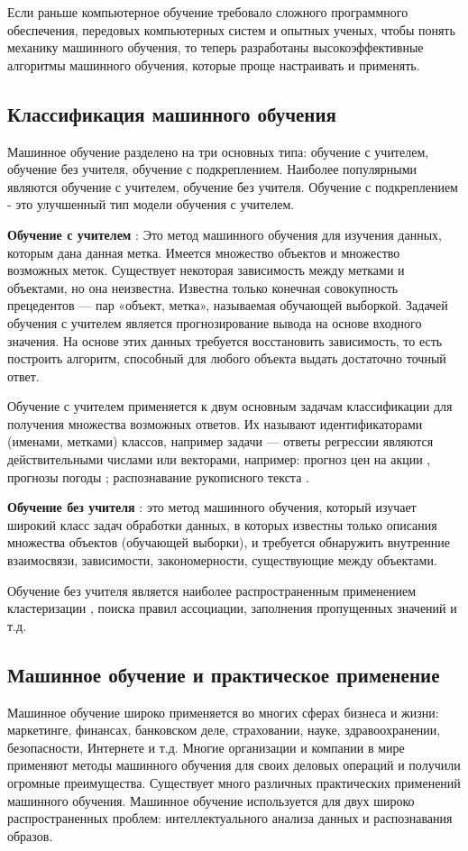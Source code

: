 \documentclass[a4paper,14pt]{extreport}
\begin{document}
Если раньше компьютерное обучение требовало сложного программного обеспечения, передовых компьютерных систем и опытных ученых, чтобы понять механику машинного обучения, то теперь разработаны высокоэффективные алгоритмы машинного обучения, которые проще настраивать и применять.
\subsection{Классификация машинного обучения}
Машинное обучение разделено на три основных типа: обучение с учителем, обучение без учителя, обучение с подкреплением. Наиболее популярными являются обучение с учителем, обучение без учителя. Обучение с подкреплением - это улучшенный тип модели обучения с учителем.

\textbf{Обучение с учителем }\cite{h29,h30}: Это метод машинного обучения для изучения данных, которым дана данная метка. Имеется множество объектов и множество возможных меток. Существует некоторая зависимость между метками и объектами, но она неизвестна. Известна только конечная совокупность прецедентов — пар «объект, метка», называемая обучающей выборкой. Задачей обучения с учителем является прогнозирование вывода на основе входного значения. На основе этих данных требуется восстановить зависимость, то есть построить алгоритм, способный для любого объекта выдать достаточно точный ответ.

Обучение с учителем применяется к двум основным задачам классификации для получения множества возможных ответов. Их называют идентификаторами (именами, метками) классов, например задачи — ответы регрессии являются действительными числами или векторами, например: прогноз цен на акции \cite{h31,h32}, прогнозы погоды \cite{h33}; распознавание рукописного текста \cite{h34, h35}.

\textbf{Обучение без учителя} \cite{h36}: это метод машинного обучения, который изучает широкий класс задач обработки данных, в которых известны только описания множества объектов (обучающей выборки), и требуется обнаружить внутренние взаимосвязи, зависимости, закономерности, существующие между объектами. 

Обучение без учителя является наиболее распространенным применением кластеризации \cite{h37, h38, h39, h40}, поиска правил ассоциации, заполнения пропущенных значений и т.д.

\subsection{Машинное обучение и практическое применение}
Машинное обучение широко применяется во многих сферах бизнеса и жизни: маркетинге, финансах, банковском деле, страховании, науке, здравоохранении, безопасности, Интернете и т.д. Многие организации и компании в мире применяют методы машинного обучения для своих деловых операций и получили огромные преимущества. Существует много различных практических применений машинного обучения. Машинное обучение используется для двух широко распространенных проблем: интеллектуального анализа данных и распознавания образов.
\end{document}
